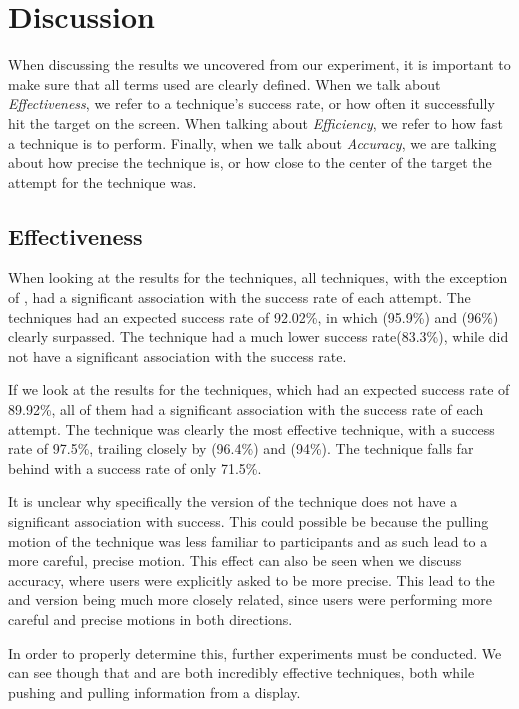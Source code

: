 \section{Discussion}\label{sec:discussion}
When discussing the results we uncovered from our experiment, it is important to make sure that all terms used are clearly defined. When we talk about \emph{Effectiveness}, we refer to a technique's success rate, or how often it successfully hit the target on the screen. When talking about \emph{Efficiency}, we refer to how fast a technique is to perform. Finally, when we talk about \emph{Accuracy}, we are talking about how precise the technique is, or how close to the center of the target the attempt for the technique was. 

\subsection{Effectiveness}

When looking at the results for the \push techniques, all techniques, with the exception of \throw, had a significant association with the success rate of each attempt.
The \push techniques had an expected success rate of 92.02\%, in which \grab (95.9\%) and \swipe (96\%) clearly surpassed.
The \tilt technique had a much lower success rate(83.3\%), while \throw did not have a significant association with the success rate.

If we look at the results for the \pull techniques, which had an expected success rate of 89.92\%, all of them had a significant association with the success rate of each attempt.  
The \swipe technique was clearly the most effective technique, with a success rate of 97.5\%, trailing closely by \throw (96.4\%) and \grab (94\%). 
The \tilt technique falls far behind with a success rate of only 71.5\%. 

It is unclear why specifically the \push version of the \throw technique does not have a significant association with success.
This could possible be because the pulling motion of the \throw technique was less familiar to participants and as such lead to a more careful, precise motion.
This effect can also be seen when we discuss accuracy, where users were explicitly asked to be more precise.
This lead to the \push and \pull version being much more closely related, since users were performing more careful and precise motions in both directions. 

In order to properly determine this, further experiments must be conducted.
We can see though that \swipe and \grab are both incredibly effective techniques, both while pushing and pulling information from a display.



